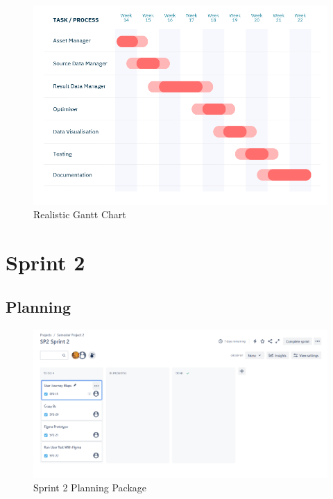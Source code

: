 \documentclass[12pt]{report}
\begin{document}
\begin{figure}[H]
  \centering
  \includegraphics[width=1\textwidth]{Resources/1-Sprint/Gantt-Chart-Realistic.png}
  \caption{Realistic Gantt Chart}
  \label{fig:RealGanttChart}
\end{figure}
\clearpage





\section{Sprint 2}
\subsection*{Planning}
\begin{figure}[H]
  \centering
  \includegraphics[width=1\textwidth]{Resources/2-Sprint/Planning/Sprint2_Planning_Package.png}
  \caption{Sprint 2 Planning Package}
  \label{fig:S2Planning}
\end{figure}
\end{document}
